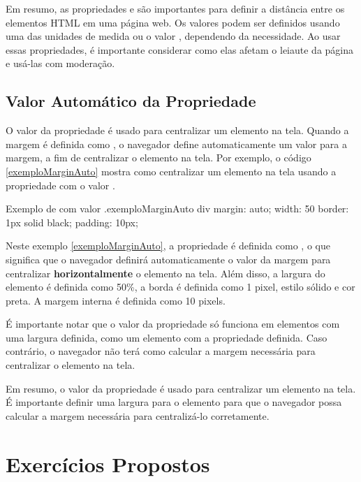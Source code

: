 Em resumo, as propriedades  e  são importantes para definir a distância entre os elementos HTML em uma página web. Os valores podem ser definidos usando uma das unidades de medida ou o valor , dependendo da necessidade. Ao usar essas propriedades, é importante considerar como elas afetam o leiaute da página e usá-las com moderação.

\subsection{Valor Automático da Propriedade }

O valor  da propriedade  é usado para centralizar um elemento na tela. Quando a margem é definida como , o navegador define automaticamente um valor para a margem, a fim de centralizar o elemento na tela. Por exemplo, o código \ref{exemploMarginAuto} mostra como centralizar um elemento  na tela usando a propriedade  com o valor .

\begin{csscode}{Exemplo de  com valor .}{exemploMarginAuto}
div {
    margin: auto;
    width: 50%
    border: 1px solid black;
    padding: 10px;
}
\end{csscode}

Neste exemplo \ref{exemploMarginAuto}, a propriedade  é definida como , o que significa que o navegador definirá automaticamente o valor da margem para centralizar \textbf{horizontalmente} o elemento  na tela. Além disso, a largura do elemento é definida como 50\%, a borda é definida como 1 pixel, estilo sólido e cor preta. A margem interna é definida como 10 pixels.

É importante notar que o valor  da propriedade  só funciona em elementos com uma largura definida, como um elemento com a propriedade  definida. Caso contrário, o navegador não terá como calcular a margem necessária para centralizar o elemento na tela.

Em resumo, o valor  da propriedade  é usado para centralizar um elemento na tela. É importante definir uma largura para o elemento para que o navegador possa calcular a margem necessária para centralizá-lo corretamente.

\section{Exercícios Propostos}

